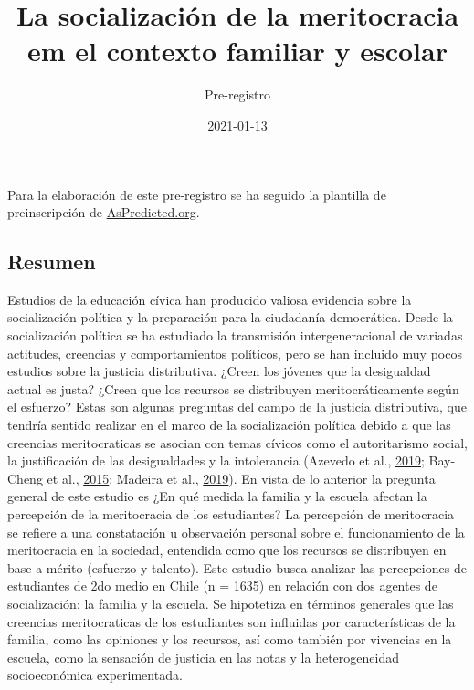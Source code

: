 \documentclass[
  12pt,
]{article}
\title{La socialización de la meritocracia em el contexto familiar y
escolar}
\subtitle{Pre-registro}
\author{}
\date{\vspace{-2.5em}2021-01-13}
\begin{document}
\maketitle

Para la elaboración de este pre-registro se ha seguido la plantilla de
preinscripción de \href{https://aspredicted.org/}{AsPredicted.org}.

\hypertarget{resumen}{%
\subsection{Resumen}\label{resumen}}

Estudios de la educación cívica han producido valiosa evidencia sobre la
socialización política y la preparación para la ciudadanía democrática.
Desde la socialización política se ha estudiado la transmisión
intergeneracional de variadas actitudes, creencias y comportamientos
políticos, pero se han incluido muy pocos estudios sobre la justicia
distributiva. ¿Creen los jóvenes que la desigualdad actual es justa?
¿Creen que los recursos se distribuyen meritocráticamente según el
esfuerzo? Estas son algunas preguntas del campo de la justicia
distributiva, que tendría sentido realizar en el marco de la
socialización política debido a que las creencias meritocraticas se
asocian con temas cívicos como el autoritarismo social, la justificación
de las desigualdades y la intolerancia (Azevedo et al.,
\protect\hyperlink{ref-azevedo_Neoliberal_2019}{2019}; Bay-Cheng et al.,
\protect\hyperlink{ref-bay-cheng_Tracking_2015a}{2015}; Madeira et al.,
\protect\hyperlink{ref-madeira_Primes_2019}{2019}). En vista de lo
anterior la pregunta general de este estudio es ¿En qué medida la
familia y la escuela afectan la percepción de la meritocracia de los
estudiantes? La percepción de meritocracia se refiere a una constatación
u observación personal sobre el funcionamiento de la meritocracia en la
sociedad, entendida como que los recursos se distribuyen en base a
mérito (esfuerzo y talento). Este estudio busca analizar las
percepciones de estudiantes de 2do medio en Chile (n = 1635) en relación
con dos agentes de socialización: la familia y la escuela. Se hipotetiza
en términos generales que las creencias meritocraticas de los
estudiantes son influidas por características de la familia, como las
opiniones y los recursos, así como también por vivencias en la escuela,
como la sensación de justicia en las notas y la heterogeneidad
socioeconómica experimentada.

\pagebreak
\end{document}
